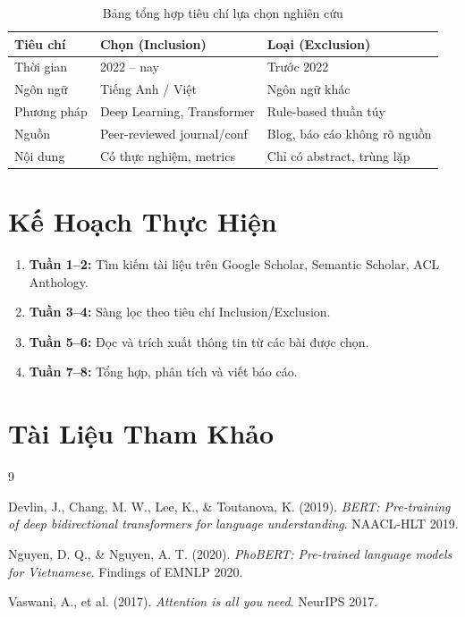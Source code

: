 \documentclass[12pt, a4paper]{article}
\begin{document}
\begin{table}[h!]
\centering
\begin{tabularx}{0.9\textwidth}{l X X}
\toprule
\textbf{Tiêu chí} & \textbf{Chọn (Inclusion)} & \textbf{Loại (Exclusion)} \\
\midrule
Thời gian    & 2022 -- nay              & Trước 2022 \\
Ngôn ngữ     & Tiếng Anh / Việt         & Ngôn ngữ khác \\
Phương pháp  & Deep Learning, Transformer & Rule-based thuần túy \\
Nguồn        & Peer-reviewed journal/conf & Blog, báo cáo không rõ nguồn \\
Nội dung     & Có thực nghiệm, metrics   & Chỉ có abstract, trùng lặp \\
\bottomrule
\end{tabularx}
\caption{Bảng tổng hợp tiêu chí lựa chọn nghiên cứu}
\end{table}

\section{Kế Hoạch Thực Hiện}

\begin{enumerate}
    \item \textbf{Tuần 1--2:} Tìm kiếm tài liệu trên Google Scholar, Semantic Scholar, ACL Anthology.
    \item \textbf{Tuần 3--4:} Sàng lọc theo tiêu chí Inclusion/Exclusion.
    \item \textbf{Tuần 5--6:} Đọc và trích xuất thông tin từ các bài được chọn.
    \item \textbf{Tuần 7--8:} Tổng hợp, phân tích và viết báo cáo.
\end{enumerate}

\section*{Tài Liệu Tham Khảo}

\begin{thebibliography}{9}

Devlin, J., Chang, M. W., Lee, K., \& Toutanova, K. (2019).
\textit{BERT: Pre-training of deep bidirectional transformers for language understanding}.
NAACL-HLT 2019.

Nguyen, D. Q., \& Nguyen, A. T. (2020).
\textit{PhoBERT: Pre-trained language models for Vietnamese}.
Findings of EMNLP 2020.

Vaswani, A., et al. (2017).
\textit{Attention is all you need}.
NeurIPS 2017.

\end{thebibliography}
\end{document}
